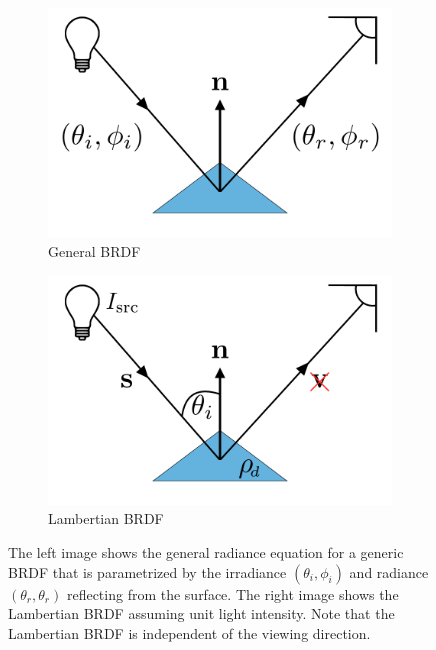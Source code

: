 \begin{figure}[t]
	\centering
	\begin{subfigure}[b]{0.45\textwidth}
		\centering
		\includegraphics[width=\textwidth]{background/images/general_brdf}
		\caption*{General BRDF}
	\end{subfigure}
	\begin{subfigure}[b]{0.45\textwidth}
		\centering
		\includegraphics[width=\textwidth]{background/images/lambertian_brdf}
		\caption*{Lambertian BRDF}
	\end{subfigure}
	\caption{The left image shows the general radiance equation for a generic
	         BRDF that is parametrized by the irradiance $(\theta_i, \phi_i)$
	         and radiance $(\theta_r, \theta_r)$ reflecting from the surface.
	         The right image shows the Lambertian BRDF assuming unit light
	         intensity. Note that the Lambertian BRDF is independent of
	         the viewing direction.}
\label{fig:bg_sfs_brdf_example}
\end{figure}

